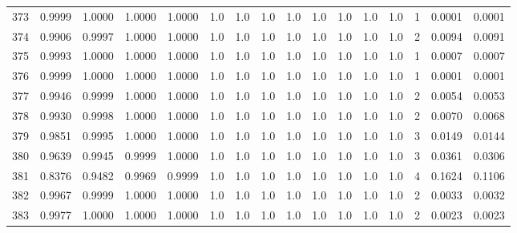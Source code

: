 \begin{tabular}{lrrrrrrrrrrrrrrr}
373 &      0.9999 &  1.0000 &  1.0000 &  1.0000 &     1.0 &     1.0 &     1.0 &     1.0 &     1.0 &     1.0 &      1.0 &        1.0 &      1 &                    0.0001 &                     0.0001 \\
374 &      0.9906 &  0.9997 &  1.0000 &  1.0000 &     1.0 &     1.0 &     1.0 &     1.0 &     1.0 &     1.0 &      1.0 &        1.0 &      2 &                    0.0094 &                     0.0091 \\
375 &      0.9993 &  1.0000 &  1.0000 &  1.0000 &     1.0 &     1.0 &     1.0 &     1.0 &     1.0 &     1.0 &      1.0 &        1.0 &      1 &                    0.0007 &                     0.0007 \\
376 &      0.9999 &  1.0000 &  1.0000 &  1.0000 &     1.0 &     1.0 &     1.0 &     1.0 &     1.0 &     1.0 &      1.0 &        1.0 &      1 &                    0.0001 &                     0.0001 \\
377 &      0.9946 &  0.9999 &  1.0000 &  1.0000 &     1.0 &     1.0 &     1.0 &     1.0 &     1.0 &     1.0 &      1.0 &        1.0 &      2 &                    0.0054 &                     0.0053 \\
378 &      0.9930 &  0.9998 &  1.0000 &  1.0000 &     1.0 &     1.0 &     1.0 &     1.0 &     1.0 &     1.0 &      1.0 &        1.0 &      2 &                    0.0070 &                     0.0068 \\
379 &      0.9851 &  0.9995 &  1.0000 &  1.0000 &     1.0 &     1.0 &     1.0 &     1.0 &     1.0 &     1.0 &      1.0 &        1.0 &      3 &                    0.0149 &                     0.0144 \\
380 &      0.9639 &  0.9945 &  0.9999 &  1.0000 &     1.0 &     1.0 &     1.0 &     1.0 &     1.0 &     1.0 &      1.0 &        1.0 &      3 &                    0.0361 &                     0.0306 \\
381 &      0.8376 &  0.9482 &  0.9969 &  0.9999 &     1.0 &     1.0 &     1.0 &     1.0 &     1.0 &     1.0 &      1.0 &        1.0 &      4 &                    0.1624 &                     0.1106 \\
382 &      0.9967 &  0.9999 &  1.0000 &  1.0000 &     1.0 &     1.0 &     1.0 &     1.0 &     1.0 &     1.0 &      1.0 &        1.0 &      2 &                    0.0033 &                     0.0032 \\
383 &      0.9977 &  1.0000 &  1.0000 &  1.0000 &     1.0 &     1.0 &     1.0 &     1.0 &     1.0 &     1.0 &      1.0 &        1.0 &      2 &                    0.0023 &                     0.0023 \\

\end{tabular}
